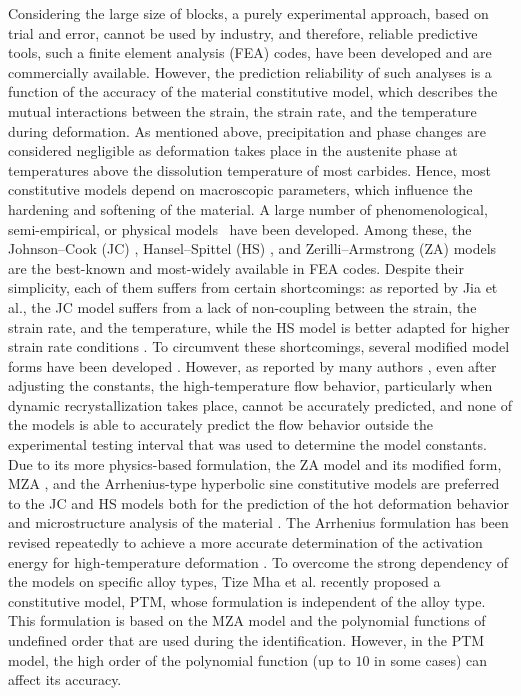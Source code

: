 \documentclass[metals,article,accept,pdftex,moreauthors]{Definitions/mdpi}
\makeatletter
\DeclareRobustCommand{\eal}{et al.\@\xspace}
\makeatother
\begin{document}
Considering the large size of blocks, a purely experimental approach, based on trial and error, cannot be used by industry, and therefore, reliable predictive tools, such a finite element analysis (FEA) codes, have been developed and are commercially available.
However, the prediction reliability of such analyses is a function of the accuracy of the material constitutive model, which describes the mutual interactions between the strain, the strain rate, and the temperature during deformation.
As mentioned above, precipitation and phase changes are considered negligible as deformation takes place in the austenite phase at temperatures above the dissolution temperature of most carbides.
Hence, most constitutive models depend on macroscopic parameters, which influence the hardening and softening of the material.
A large number of phenomenological, semi-empirical, or physical \mbox{models~\cite{jia2022thermo, costa2016study, rudnytskyj2020constitutive, Pantale-2021}} have been developed.
Among these, the Johnson--Cook (JC) \cite{Johnson-1983}, Hansel--Spittel (HS) \cite{chadha2018approach}, and Zerilli--Armstrong (ZA) \cite{Zerilli-1987} models are the best-known and most-widely available in FEA codes.
Despite their simplicity, each of them suffers from certain shortcomings: as reported by Jia \eal \cite{Jia-2021}, the JC model suffers from a lack of non-coupling between the strain, the strain rate, and the temperature, while the HS model is better adapted for higher strain rate conditions \cite{chadha2018approach}.
To circumvent these shortcomings, several modified model forms have been developed \cite{chadha2018approach, liu2021modified, jia2022thermo1, bai2022comparison, zhu2022constitutive, Jia-2021, sim2022modified}.
However, as reported by many authors \cite{Li-2013, Zhang-2015, Zhou-2019}, even after adjusting the constants, the high-temperature flow behavior, particularly when dynamic recrystallization takes place, cannot be accurately predicted, and none of the models is able to accurately predict the flow behavior outside the experimental testing interval that was used to determine the model constants.
Due to its more physics-based formulation, the ZA model and its modified form, MZA \cite{ovesy2020explicit, niu2020constitutive, Muralli-2017, Cheng-2021, Muralli-2021}, and the Arrhenius-type hyperbolic sine constitutive models are preferred to the JC and HS models both for the prediction of the hot deformation behavior and microstructure analysis of the material \cite{derazkola2021review, wang2022deformation, miao2022deformation}.
The Arrhenius formulation has been revised repeatedly to achieve a more accurate determination of the activation energy for high-temperature deformation \cite{rudnytskyj2022investigating, ji2020optimization}.
To overcome the strong dependency of the models on specific alloy types, Tize Mha \eal \cite{TizeMha-2022} recently proposed a constitutive model, PTM, whose formulation is independent of the alloy type.
This formulation is based on the MZA model and the polynomial functions of undefined order that are used during the identification.
However, in the PTM model, the high order of the polynomial function (up to $10$ in some cases) can affect its accuracy.
\end{document}

